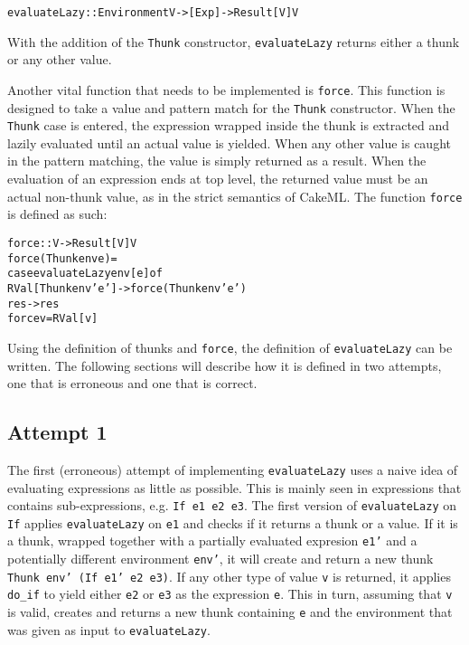\begin{alltt}
  evaluateLazy :: Environment V -> [Exp] -> Result [V] V
\end{alltt}

\noindent With the addition of the \texttt{Thunk} constructor, \texttt{evaluateLazy}
returns either a thunk or any other value.

Another vital function that needs to be implemented is \texttt{force}.
This function is designed to take a value and pattern match for the
\texttt{Thunk} constructor. When the \texttt{Thunk} case is entered,
the expression wrapped inside the thunk is extracted and lazily evaluated until
an actual value is yielded. When any other value is caught in the pattern matching,
the value is simply returned as a result.
When the evaluation of an expression ends at top level, the returned value
must be an actual non-thunk value, as in the strict semantics of CakeML.
The function \texttt{force} is defined as such:

\begin{alltt}
  force :: V -> Result [V] V
  force (Thunk env e) =
    case evaluateLazy env [e] of
      RVal [Thunk env' e'] -> force (Thunk env' e')
      res -> res
  force v = RVal [v]
\end{alltt}

Using the definition of thunks and \texttt{force}, the definition of
\texttt{evaluateLazy} can be written.
The following sections will describe how it is defined in two attempts,
one that is erroneous and one that is correct.

\subsection{Attempt 1}
The first (erroneous) attempt of implementing \texttt{evaluateLazy} uses a naive
idea of evaluating expressions as little as possible. This is mainly seen in
expressions that contains sub-expressions, e.g. \texttt{If e1 e2 e3}. The first
version of \texttt{evaluateLazy} on \texttt{If} applies
\texttt{evaluateLazy} on \texttt{e1} and checks if it returns a thunk or a
value. If it is a thunk, wrapped together with a partially evaluated expresion
\texttt{e1'} and a potentially different environment \texttt{env'}, it will
create and return a new thunk \texttt{Thunk env' (If e1' e2 e3)}. If any other
type of value \texttt{v} is returned, it applies \texttt{do\_if} to yield either
\texttt{e2} or \texttt{e3} as the expression \texttt{e}. This in turn,
assuming that \texttt{v} is valid, creates and returns a new thunk containing
\texttt{e} and the environment that was given as input to \texttt{evaluateLazy}.

